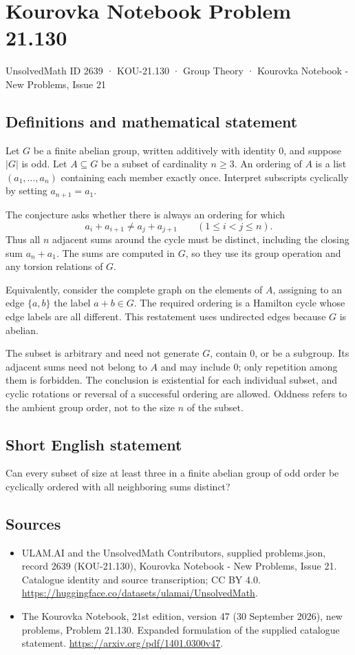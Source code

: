 \documentclass[11pt,a4paper]{article}
\begin{document}
\section*{Kourovka Notebook Problem 21.130}\label{2639}
{\small UnsolvedMath ID 2639 · KOU-21.130 · Group Theory · Kourovka Notebook - New Problems, Issue 21}
\subsection{Definitions and mathematical statement}
Let $G$ be a finite abelian group, written additively with identity $0$, and suppose $|G|$ is odd. Let $A\subseteq G$ be a subset of cardinality $n\ge3$. An ordering of $A$ is a list $(a_1,\ldots,a_n)$ containing each member exactly once. Interpret subscripts cyclically by setting $a_{n+1}=a_1$.

The conjecture asks whether there is always an ordering for which
\[
 a_i+a_{i+1}\ne a_j+a_{j+1}
 \qquad(1\le i<j\le n).
\]
Thus all $n$ adjacent sums around the cycle must be distinct, including the closing sum $a_n+a_1$. The sums are computed in $G$, so they use its group operation and any torsion relations of $G$.

Equivalently, consider the complete graph on the elements of $A$, assigning to an edge $\{a,b\}$ the label $a+b\in G$. The required ordering is a Hamilton cycle whose edge labels are all different. This restatement uses undirected edges because $G$ is abelian.

The subset is arbitrary and need not generate $G$, contain $0$, or be a subgroup. Its adjacent sums need not belong to $A$ and may include $0$; only repetition among them is forbidden. The conclusion is existential for each individual subset, and cyclic rotations or reversal of a successful ordering are allowed. Oddness refers to the ambient group order, not to the size $n$ of the subset.
\subsection{Short English statement}
Can every subset of size at least three in a finite abelian group of odd order be cyclically ordered with all neighboring sums distinct?
\subsection{Sources}
\begin{itemize}
\item[S1] ULAM.AI and the UnsolvedMath Contributors, supplied problems.json, record 2639 (KOU-21.130), Kourovka Notebook - New Problems, Issue 21. Catalogue identity and source transcription; CC BY 4.0.
\url{https://huggingface.co/datasets/ulamai/UnsolvedMath}.
\item[S2] The Kourovka Notebook, 21st edition, version 47 (30 September 2026), new problems, Problem 21.130. Expanded formulation of the supplied catalogue statement.
\url{https://arxiv.org/pdf/1401.0300v47}.
\end{itemize}
\end{document}
